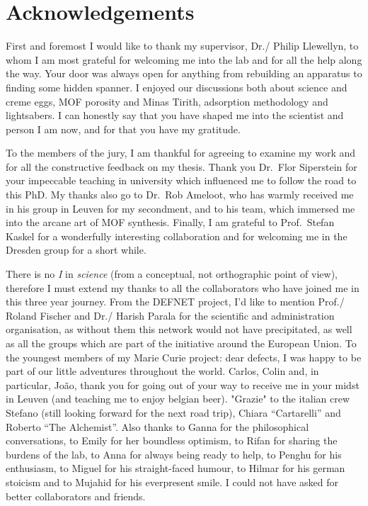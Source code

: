 
\chapter{Acknowledgements}

First and foremost I would like to thank my supervisor, Dr./ Philip Llewellyn,
to whom I am most grateful for welcoming me into the lab and for all the help
along the way. Your door was always open for anything from rebuilding
an apparatus to finding some hidden spanner. I enjoyed our discussions 
both about science and creme eggs, MOF porosity and Minas Tirith, adsorption 
methodology and lightsabers. I can honestly say that you have shaped
me into the scientist and person I am now, and for that you have my gratitude.

To the members of the jury, I am thankful for agreeing to examine 
my work and for all the constructive feedback on my thesis.
Thank you Dr.\ Flor Siperstein for your impeccable teaching in university which
influenced me to follow the road to this PhD. My thanks also go to Dr.\ Rob Ameloot,
who has warmly received me in his group in Leuven for my secondment, and 
to his team, which immersed me into the arcane art of MOF synthesis.
Finally, I am grateful to Prof.\ Stefan Kaskel for a wonderfully interesting
collaboration and for welcoming me in the Dresden group for a
short while.

There is no \textit{I} in \textit{science} (from a conceptual, not orthographic
point of view), therefore I must extend my thanks to all the collaborators
who have joined me in this three year journey. From the DEFNET project,
I'd like to mention Prof./ Roland Fischer and Dr./ Harish Parala for the 
scientific and administration organisation, as without them this network
would not have precipitated, as well as all the groups which are part 
of the initiative around the European Union. To the youngest members of 
my Marie Curie project: dear defects, I was happy to be part of our little
adventures throughout the world. Carlos, Colin and, in particular, João,
thank you for going out of your way to receive me in your midst in Leuven
(and teaching me to enjoy belgian beer). "Grazie" to the italian crew 
Stefano (still looking forward for the next road trip), Chiara ``Cartarelli''
and Roberto ``The Alchemist''. Also thanks to Ganna for the philosophical 
conversations, to Emily for her boundless optimism, to Rifan for sharing
the burdens of the lab, to Anna for always being ready to help,
to Penghu for his enthusiasm, to Miguel for his straight-faced humour,
to Hilmar for his german stoicism and to Mujahid for his everpresent smile.
I could not have asked for better collaborators and friends.

